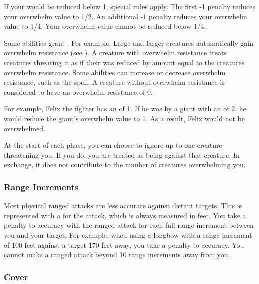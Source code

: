             If your  would be reduced below 1, special rules apply.
            The first -1 penalty reduces your overwhelm value to 1/2.
            An additional -1 penalty reduces your overwhelm value to 1/4.
            Your overwhelm value cannot be reduced below 1/4.

            \label{Overwhelm Resistance} Some abilities grant .
            For example, Large and larger creatures automatically gain overwhelm resistance (see ).
            A creature with overwhelm resistance treats creatures threating it as if their  was reduced by amount equal to the creatures overwhelm resistance.
            Some abilities can increase or decrease overwhelm resistance, such as the  spell.
            A creature without overwhelm resistance is considered to have an overwhelm resistance of 0.

            For example, Felix the fighter has an  of 1.
            If he was  by a giant with an  of 2, he would reduce the giant's overwhelm value to 1.
            As a result, Felix would not be overwhelmed.

             At the start of each phase, you can choose to ignore up to one creature threatening you.
            If you do, you are treated as being \unaware against that creature.
            In exchange, it does not contribute to the number of creatures overwhelming you.

        \subsubsection{Range Increments}\label{Range Increments}
            Most physical ranged attacks are less accurate against distant targets.
            This is represented with a  for the attack, which is always measured in feet.
            You take a  penalty to accuracy with the ranged attack for each full range increment between you and your target.
            For example, when using a longbow with a range increment of 100 feet against a target 170 feet away, you take a  penalty to accuracy.
            You cannot make a ranged attack beyond 10 range increments away from you.

        \subsubsection{Cover}\label{Cover}

